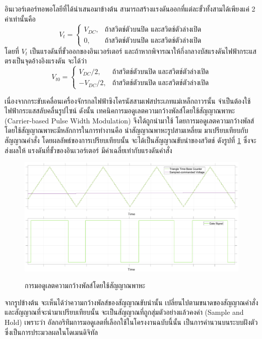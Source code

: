\documentclass[11pt,a4paper]{article}
\begin{document}
อินเวอร์เตอร์ทอพอโลยีที่ได้นำเสนอมาข้างต้น สามารถสร้างแรงดันออกที่แต่ละขั้วทั้งสามได้เพียงแค่ 2 ค่าเท่านั้นคือ
\begin{equation}
    V_t = \begin{cases}
        V_{DC}, & \text{ถ้าสวิตช์ตัวบนปิด และสวิตช์ตัวล่างเปิด} \\
        0,      & \text{ถ้าสวิตช์ตัวบนปิด และสวิตช์ตัวล่างเปิด}
    \end{cases}
\end{equation}
โดยที่ $V_t$ เป็นแรงดันที่ขั้วออกของอินเวอร์เตอร์
และถ้าหากพิจารณาให้กึ่งกลางบัสแรงดันไฟฟ้ากระแสตรงเป็นจุดอ้างอิงแรงดัน จะได้ว่า
\begin{equation}
    V_{t0} = \begin{cases}
        V_{DC}/2,  & \text{ถ้าสวิตช์ตัวบนปิด และสวิตช์ตัวล่างเปิด} \\
        -V_{DC}/2, & \text{ถ้าสวิตช์ตัวบนปิด และสวิตช์ตัวล่างเปิด}
    \end{cases}
\end{equation}

เนื่องจากกระขับเคลื่อนเครื่องจักรกลไฟฟ้าซิงโครนัสสามเฟสประเภทแม่เหล็กถาวรนั้น จำเป็นต้องใช้ไฟฟ้ากระแสสลับคลื่นรูปไซน์ ดังนั้น เทคนิคการมอดูเลตความกว้างพัลส์โดยใช้สัญญาณพาหะ (Carrier-based Pulse Width Modulation) จึงได้ถูกนำมาใช้ โดยการมอดูเลตความกว้างพัลส์โดยใช้สัญญาณพาหะมีหลักการในการทำงานคือ นำสัญญาณพาหะรูปสามเหลี่ยม มาเปรียบเทียบกับสัญญาณคำสั่ง โดยผลลัพธ์ของการเปรียบเทียบนั้น จะได้เป็นสัญญาณขับนำของสวิตช์ ดังรูปที่ \ref{spwmgraph} ซึ่งจะส่งผลให้ แรงดันที่ขั้วของอินเวอร์เตอร์ มีค่าเฉลี่ยเท่ากับแรงดันคำสั่ง

\begin{figure}[!h]
    \includegraphics[width=\textwidth]{spwm.eps}
    \label{spwmgraph}
    \caption{การมอดูเลตความกว้างพัลส์โดยใช้สัญญาณพาหะ}
\end{figure}

จากรูปข้างต้น จะเห็นได้ว่าความกว้างพัลส์ของสัญญาณขับนำนั้น เปลี่ยนไปตามขนาดของสัญญาณคำสั่ง และสัญญาณที่จะนำมาเปรียบเทียบนั้น จะเป็นสัญญาณที่ถูกสุ่มตัวอย่างแล้วคงค่า (Sample and Hold) เพราะว่า อัลกอริทึมการมอดูเลตที่เลือกใช้ในโครงงานฉบับนี้นั้น เป็นการคำนวนบนระบบฝังตัว ซึ่งเป็นการประมวลผลในโดเมนดิจิทัล
\end{document}
